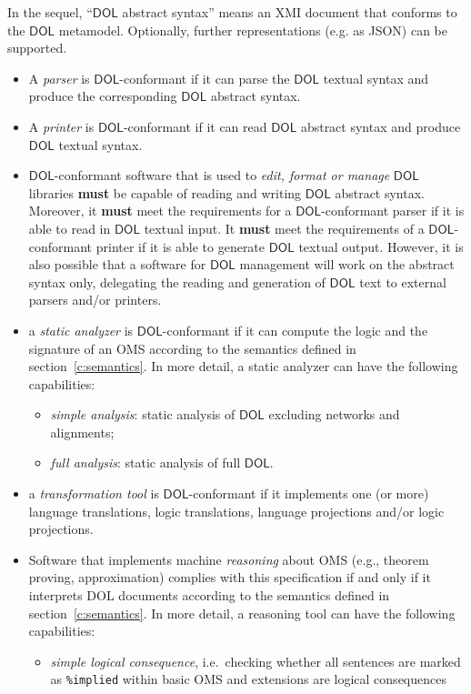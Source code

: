 \documentclass[10pt,fleqn,final]{scrreprt}
\newcommand*{\syntax}[1]{\texttt{#1}}
\newcommand*{\hasto}{\textbf{must}\xspace}
\newcommand*{\DOL}{\ensuremath{\mathsf{DOL}}\xspace}
\begin{document}
In the sequel, ``\DOL abstract syntax'' means an XMI document that
conforms to the \DOL metamodel. Optionally, further representations
(e.g. as JSON) can be supported.
\begin{itemize}
\item
A \emph{parser} is \DOL-conformant if it can parse the \DOL textual syntax and produce the corresponding \DOL abstract syntax.
\item
A \emph{printer} is \DOL-conformant if it can read \DOL abstract syntax and produce \DOL textual syntax.
\item
{\DOL}-conformant software that is used to \emph{edit, format or manage} \DOL libraries \hasto be capable of reading and writing \DOL abstract syntax. Moreover, it \hasto meet the requirements for a \DOL-conformant parser if it is able to read in \DOL textual input. It \hasto meet the requirements of a \DOL-conformant printer if it is able to generate \DOL textual output. However, it is also possible that a software for \DOL management will work on the abstract syntax only, delegating the reading and generation of \DOL text to external parsers and/or printers.
\item a \emph{static analyzer} is \DOL-conformant if it can compute
  the logic and the signature of an OMS according to the semantics
  defined in section~\ref{c:semantics}. In more detail, a static analyzer
  can have the following capabilities:
\begin{itemize}
\item \emph{simple analysis}: static analysis of \DOL excluding networks and alignments;
\item \emph{full analysis}: static analysis of full \DOL.
\end{itemize}
\item a \emph{transformation tool} is \DOL-conformant if it implements
one (or more) language translations, logic translations, language
projections and/or logic projections.
\item
Software that implements machine \emph{reasoning} about OMS (e.g., theorem proving, approximation)  complies with this specification if and only if it interprets  DOL documents according to the semantics defined in section~\ref{c:semantics}. In more detail, a reasoning tool can have the following capabilities:
\begin{itemize}
\item \emph{simple logical consequence}, i.e.\ checking whether all sentences are marked as \syntax{\%implied} within basic OMS
and extensions are logical consequences

\end{itemize}
\end{itemize}
\end{document}

